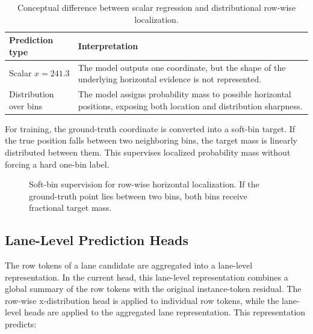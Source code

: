 \documentclass[conference]{IEEEtran}
\begin{document}
\begin{table}[t]
\centering
\caption{Conceptual difference between scalar regression and distributional row-wise localization.}
\label{tab:regression-vs-distribution}
\begin{tabularx}{\linewidth}{lX}
\toprule
Prediction type & Interpretation \\
\midrule
Scalar $x=241.3$ & The model outputs one coordinate, but the shape of the underlying horizontal evidence is not represented. \\
Distribution over bins & The model assigns probability mass to possible horizontal positions, exposing both location and distribution sharpness. \\
\bottomrule
\end{tabularx}
\end{table}

For training, the ground-truth coordinate is converted into a soft-bin target. If the true position falls between two neighboring bins, the target mass is linearly distributed between them. This supervises localized probability mass without forcing a hard one-bin label.

\begin{figure}[t]
\centering
{}
\caption{Soft-bin supervision for row-wise horizontal localization. If the ground-truth point lies between two bins, both bins receive fractional target mass.}
\label{fig:softbin}
\end{figure}

\subsection{Lane-Level Prediction Heads}

The row tokens of a lane candidate are aggregated into a lane-level representation. In the current head, this lane-level representation combines a global summary of the row tokens with the original instance-token residual. The row-wise x-distribution head is applied to individual row tokens, while the lane-level heads are applied to the aggregated lane representation. This representation predicts:
\end{document}
